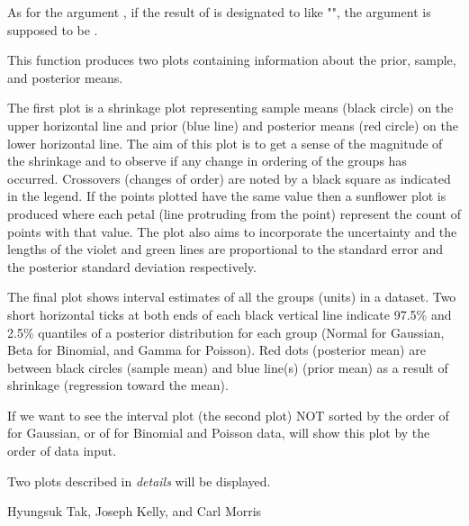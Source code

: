 \documentclass[a4paper]{book}
\begin{document}
\begin{Details}\relax
As for the argument , if the result of  is designated to 
 like "", the argument  is supposed to be .

This function produces two plots containing information about the prior, sample, and posterior means.

The first plot is a shrinkage plot representing sample means (black circle) on the
upper horizontal line and prior (blue line) and posterior means (red
circle) on the lower horizontal line. The aim of this plot is to get a sense of the
magnitude of the shrinkage and to observe if any change in ordering of the
groups has occurred. Crossovers (changes of order) are noted by a
black square as indicated in the legend. If the points plotted have
the same value then a sunflower plot is produced where each petal
(line protruding from the point) represent the count of points with
that value. The plot also aims to incorporate the uncertainty and the lengths of the violet and green lines are
proportional to the standard error and the posterior standard
deviation respectively.

The final plot shows interval estimates of all the groups (units) in a dataset. Two short horizontal ticks at both ends of each black vertical line indicate 97.5\% and 2.5\% quantiles of a posterior distribution for each group (Normal for Gaussian, Beta for Binomial, and Gamma for Poisson). Red dots (posterior mean) are between black circles (sample mean) and blue line(s) (prior mean) as a result of shrinkage (regression toward the mean).

If we want to see the interval plot (the second plot) NOT sorted by the order of  for Gaussian, or of  for Binomial and Poisson data,  will show this plot by the order of data input.
\end{Details}
%
\begin{Value}
Two plots described in \emph{details} will be displayed.
\end{Value}
%
\begin{Author}\relax
Hyungsuk Tak, Joseph Kelly, and Carl Morris
\end{Author}
%
\end{document}
